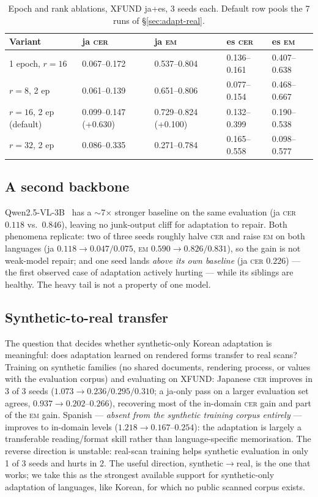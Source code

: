 \documentclass[11pt]{article}
\newcommand{\cer}{\textsc{cer}}
\newcommand{\EM}{\textsc{em}}
\begin{document}
\begin{table}[t]
\centering\small
\caption{Epoch and rank ablations, XFUND ja+es, 3 seeds each. Default row
pools the 7 runs of \S\ref{sec:adapt-real}.}
\label{tab:ablate}
\begin{tabular}{lllll}
\toprule
Variant & ja \cer{} & ja \EM{} & es \cer{} & es \EM{} \\
\midrule
1 epoch, $r{=}16$ & 0.067--0.172 & 0.537--0.804 & 0.136--0.161 & 0.407--0.638 \\
$r{=}8$, 2 ep     & 0.061--0.139 & 0.651--0.806 & 0.077--0.154 & 0.468--0.667 \\
$r{=}16$, 2 ep (default) & 0.099--0.147 (+0.630) & 0.729--0.824 (+0.100) & 0.132--0.399 & 0.190--0.538 \\
$r{=}32$, 2 ep    & 0.086--0.335 & 0.271--0.784 & 0.165--0.558 & 0.098--0.577 \\
\bottomrule
\end{tabular}
\end{table}

\subsection{A second backbone}\label{sec:backbone2}

Qwen2.5-VL-3B~\cite{bai2025qwen25vl} has a $\sim$7$\times$ stronger baseline
on the same evaluation (ja \cer{} $0.118$ vs.\ $0.846$), leaving no
junk-output cliff for adaptation to repair. Both phenomena replicate: two of
three seeds roughly halve \cer{} and raise \EM{} on both languages (ja
$0.118\to0.047/0.075$, \EM{} $0.590\to0.826/0.831$), so the gain is not
weak-model repair; and one seed lands \emph{above its own baseline} (ja
\cer{} $0.226$) --- the first observed case of adaptation actively hurting
--- while its siblings are healthy. The heavy tail is not a property of one
model.

\subsection{Synthetic-to-real transfer}\label{sec:transfer}

The question that decides whether synthetic-only Korean adaptation is
meaningful: does adaptation learned on rendered forms transfer to real
scans? Training on synthetic families (no shared documents, rendering
process, or values with the evaluation corpus) and evaluating on XFUND:
Japanese \cer{} improves in 3 of 3 seeds ($1.073\to0.236/0.295/0.310$; a
ja-only pass on a larger evaluation set agrees, $0.937\to0.202$--$0.266$),
recovering most of the in-domain \cer{} gain and part of the \EM{} gain.
Spanish --- \emph{absent from the synthetic training corpus entirely} ---
improves to in-domain levels ($1.218\to0.167$--$0.254$): the adaptation is
largely a transferable reading/format skill rather than language-specific
memorisation. The reverse direction is unstable: real-scan training helps
synthetic evaluation in only 1 of 3 seeds and hurts in 2. The useful
direction, synthetic$\to$real, is the one that works; we take this as the
strongest available support for synthetic-only adaptation of languages, like
Korean, for which no public scanned corpus exists.
\end{document}

